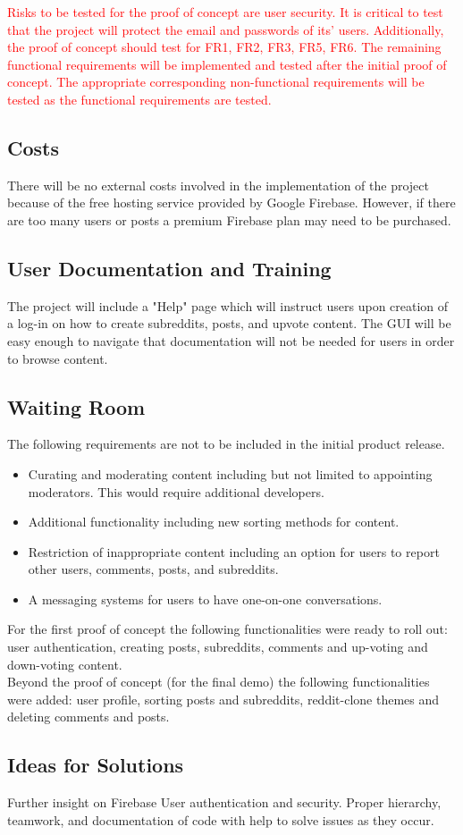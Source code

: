 \documentclass[12pt,fleqn]{article}
\begin{document}
\textcolor{red}{Risks to be tested for the proof of concept are user security.  It is critical to test that the project will protect the email and passwords of its' users.  Additionally, the proof of concept should test for FR1, FR2, FR3, FR5, FR6.  The remaining functional requirements will be implemented and tested after the initial proof of concept.  The appropriate corresponding non-functional requirements will be tested as the functional requirements are tested. }

\subsection {Costs}
There will be no external costs involved in the implementation of the project because of the free hosting service provided by Google Firebase. However, if there are too many users or posts a premium Firebase plan may need to be purchased. 

\subsection {User Documentation and Training}
The project will include a "Help" page which will instruct users upon creation of a log-in on how to create subreddits, posts, and upvote content.  The GUI will be easy enough to navigate that documentation will not be needed for users in order to browse content.
\subsection {Waiting Room}
The following requirements are not to be included in the initial product release.
\begin{itemize}
\item Curating and moderating content including but not limited to appointing moderators.  This would require additional developers.
\item Additional functionality including new sorting methods for content.
\item Restriction of inappropriate content including an option for users to report other users, comments, posts, and subreddits.
\item A messaging systems for users to have one-on-one conversations.
\end{itemize}

{\color{red}For the first proof of concept the following functionalities were ready to roll out:  user authentication, creating posts, subreddits, comments and up-voting and down-voting content. \\

Beyond the proof of concept (for the final demo) the following functionalities were added: user profile, sorting posts and subreddits, reddit-clone themes and deleting comments and posts.  }

\subsection {Ideas for Solutions}
Further insight on Firebase User authentication and security. 
Proper hierarchy, teamwork, and documentation of code with help to solve issues as they occur.
\end{document}
